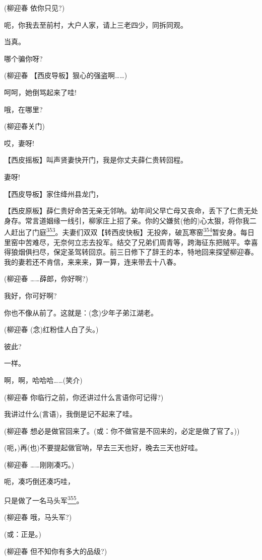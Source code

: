 (柳迎春 依你只见?)

呃，你我去至前村，大户人家，请上三老四少，同拆同观。

当真。

哪个骗你呀?

(柳迎春 【西皮导板】狠心的强盗啊\ldots{}\ldots{})

呵呵，她倒骂起来了哇!

哦，在哪里?

(柳迎春关门)

哎，妻呀!

【西皮摇板】叫声贤妻快开门，我是你丈夫薛仁贵转回程。

妻呀!

【西皮导板】家住绛州县龙门，

【西皮原板】薛仁贵好命苦无亲无邻呐。幼年间父早亡母又丧命，丢下了仁贵无处身存。常言道姻缘一线引，柳家庄上招了亲。你的父嫌贫(他的)心太狠，将你我二人赶出了门庭\protect\hyperlink{fn353}{\textsuperscript{353}}。夫妻们双双【转西皮快板】无投奔，破瓦寒窑\protect\hyperlink{fn354}{\textsuperscript{354}}暂安身。每日里窑中苦难尽，无奈何立志去投军。结交了兄弟们周青等，跨海征东把贼平。幸喜得狼烟俱扫尽，保定圣驾转回京。前三日修下了辞王的本，特地回来探望柳迎春。我的妻若还不肯信，来来来，算一算，连来带去十八春。

(柳迎春 \ldots{}\ldots{}薛郎，你好啊?)

我好，你可好啊?

你也不像从前了。这就是：(念)少年子弟江湖老。

(柳迎春 (念)红粉佳人白了头。)

彼此?

一样。

啊，啊，哈哈哈\ldots{}\ldots{}(笑介)

(柳迎春 你临行之前，你还讲过什么言语你可记得?)

我讲过什么(言语)，我倒是记不起来了哇。

(柳迎春 想必是做官回来了。(或：你不做官是不回来的，必定是做了官了。))

(呃，)再(也)不要提起做官呐，早去三天也好，晚去三天也好哇。

(柳迎春 \ldots{}\ldots{}刚刚凑巧。)

呃，凑巧倒还凑巧哇，

只是做了一名马头军\protect\hyperlink{fn355}{\textsuperscript{355}}。

(柳迎春 哦，马头军?)

(或：正是。)

(柳迎春 但不知你有多大的品级?)

